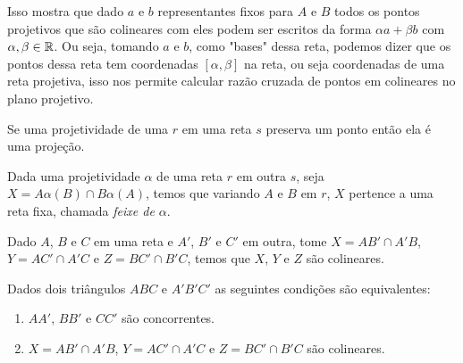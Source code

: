 Isso mostra que dado $a$ e $b$ representantes fixos para $A$ e $B$ todos os pontos projetivos que são colineares com eles podem ser escritos da forma $\alpha a + \beta b$ com $\alpha,\beta \in \mathbb{R}$. Ou seja, tomando $a$ e $b$, como "bases" dessa reta, podemos dizer que os pontos dessa reta tem coordenadas $[\alpha,\beta]$ na reta, ou seja coordenadas de uma reta projetiva, isso nos permite calcular razão cruzada de pontos em colineares no plano projetivo.

\begin{lem}
Se uma projetividade de uma $r$ em uma reta $s$ preserva um ponto então ela é uma projeção.
\end{lem}

\begin{thm}
Dada uma projetividade $\alpha$ de uma reta $r$ em outra $s$, seja $X = A\alpha(B) \cap B\alpha(A)$, temos que variando $A$ e $B$ em $r$, $X$ pertence a uma reta fixa, chamada \emph{feixe de $\alpha$}.
\end{thm}

\begin{cor}
Dado $A$, $B$ e $C$ em uma reta e $A'$, $B'$ e $C'$ em outra, tome $X = AB' \cap A'B$, $Y = AC'\cap A'C$ e $Z = BC' \cap B'C$, temos que $X$, $Y$ e $Z$ são colineares.
\end{cor}

\begin{thm}
Dados dois triângulos $ABC$ e $A'B'C'$ as seguintes condições são equivalentes:
\begin{enumerate}
    \item $AA'$, $BB'$ e $CC'$ são concorrentes.
    \item $X = AB' \cap A'B$, $Y = AC'\cap A'C$ e $Z = BC' \cap B'C$ são colineares.
\end{enumerate}

\end{thm}